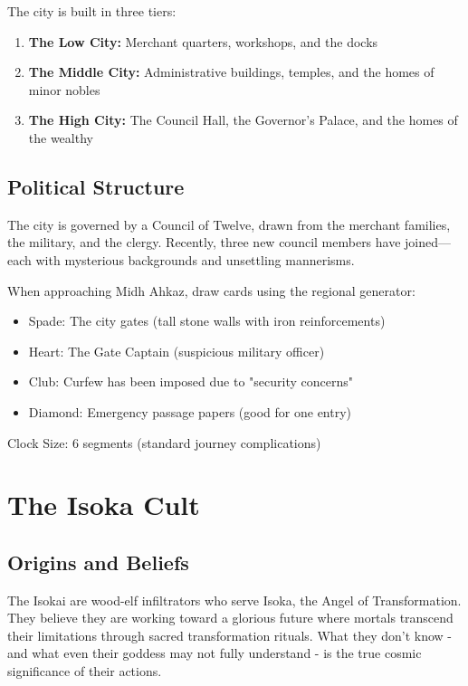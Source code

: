 \documentclass[12pt,twoside]{article}
\begin{document}
The city is built in three tiers:
\begin{enumerate}
  \item \textbf{The Low City:} Merchant quarters, workshops, and the docks
  \item \textbf{The Middle City:} Administrative buildings, temples, and the homes of minor nobles
  \item \textbf{The High City:} The Council Hall, the Governor's Palace, and the homes of the wealthy
\end{enumerate}

\subsection{Political Structure}

The city is governed by a Council of Twelve, drawn from the merchant families, the military, and the clergy. Recently, three new council members have joined—each with mysterious backgrounds and unsettling mannerisms.

When approaching Midh Ahkaz, draw cards using the regional generator:
\begin{itemize}
  \item Spade: The city gates (tall stone walls with iron reinforcements)
  \item Heart: The Gate Captain (suspicious military officer)
  \item Club: Curfew has been imposed due to "security concerns"
  \item Diamond: Emergency passage papers (good for one entry)
\end{itemize}
Clock Size: 6 segments (standard journey complications)

\section{The Isoka Cult}

\subsection{Origins and Beliefs}

The Isokai are wood-elf infiltrators who serve Isoka, the Angel of Transformation. They believe they are working toward a glorious future where mortals transcend their limitations through sacred transformation rituals. What they don't know - and what even their goddess may not fully understand - is the true cosmic significance of their actions.
\end{document}
